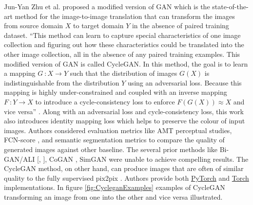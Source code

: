 Jun-Yan Zhu et al.\cite{zhu2020unpaired} proposed a modified version of \ac{GAN} which is the state-of-the-art method for the image-to-image translation that can transform the images from source domain $X$ to target domain $Y$ in the absence of paired training dataset. ``This method can learn to capture special characteristics of one image collection and figuring out how these characteristics could be translated into the other image collection, all in the absence of any paired training examples. This modified version of \ac{GAN} is called \ac{CycleGAN}. In this method, the goal is to learn a mapping $G\ \colon X \rightarrow Y$ such that the distribution of images $G(X)$ is indistinguishable from the distribution $Y$ using an adversarial loss. Because this mapping is highly under-constrained and coupled with an inverse mapping $F\ \colon Y \rightarrow X$ to introduce a cycle-consistency loss to enforce $F(G(X))\approx X$ and vice versa'' \cite{zhu2020unpaired}. Along with an adversarial loss and cycle-consistency loss, this work also introduces identity mapping loss which helps to preserve the colour of input images. Authors considered evaluation metrics like \ac{AMT} perceptual studies, FCN-score \cite{isola2018imagetoimage}, and semantic segmentation metrics to compare the quality of generated images against other baseline. The several prior methods like Bi-GAN/ALI [\cite{donahue2017adversarial}, \cite{dumoulin2017adversarially}], CoGAN \cite{liu2016coupled}, SimGAN \cite{shrivastava2017learning} were unable to achieve compelling results. The \ac{CycleGAN} method, on other hand, can produce images that are often of similar quality to the fully supervised pix2pix \cite{isola2018imagetoimage}. Authors provide both \href{https://github.com/junyanz/pytorch-CycleGAN-and-pix2pix}{PyTorch} and \href{https://github.com/junyanz/CycleGAN}{Torch} implementations. In figure \ref{fig:CycleganExamples} examples of \ac{CycleGAN} transforming an image from one into the other and vice versa illustrated.



